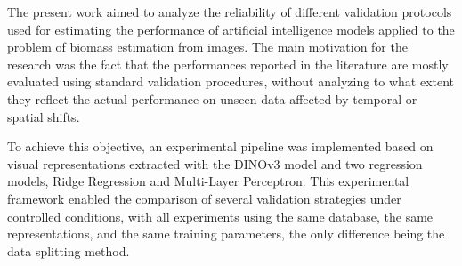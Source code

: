 



The present work aimed to analyze the reliability of different validation protocols used for estimating the performance of artificial intelligence models applied to the problem of biomass estimation from images. The main motivation for the research was the fact that the performances reported in the literature are mostly evaluated using standard validation procedures, without analyzing to what extent they reflect the actual performance on unseen data affected by temporal or spatial shifts.

To achieve this objective, an experimental pipeline was implemented based on visual representations extracted with the DINOv3 model and two regression models, Ridge Regression and Multi-Layer Perceptron. This experimental framework enabled the comparison of several validation strategies under controlled conditions, with all experiments using the same database, the same representations, and the same training parameters, the only difference being the data splitting method.

